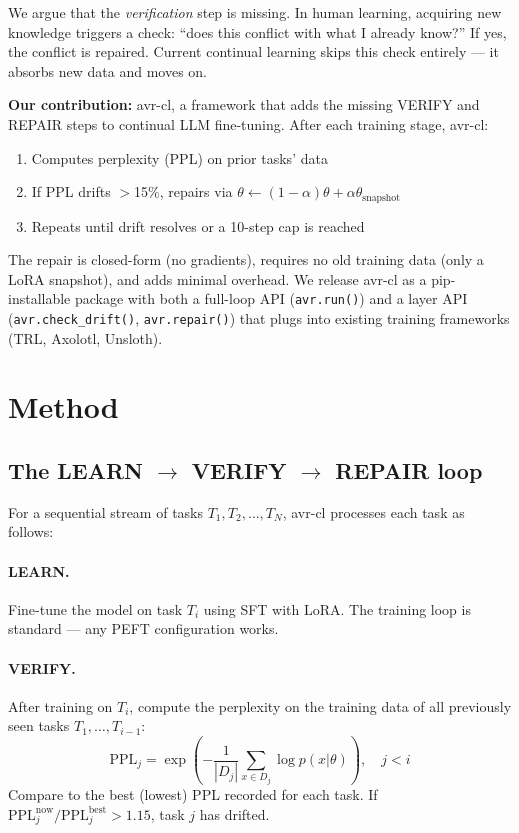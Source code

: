 \documentclass{article}
\begin{document}
We argue that the \emph{verification} step is missing. In human learning, acquiring new knowledge triggers a check: ``does this conflict with what I already know?'' If yes, the conflict is repaired. Current continual learning skips this check entirely — it absorbs new data and moves on.

\textbf{Our contribution:} avr-cl, a framework that adds the missing VERIFY and REPAIR steps to continual LLM fine-tuning. After each training stage, avr-cl:
\begin{enumerate}
    \item Computes perplexity (PPL) on prior tasks' data
    \item If PPL drifts $>$15\%, repairs via $\theta \leftarrow (1-\alpha)\theta + \alpha \theta_{\text{snapshot}}$
    \item Repeats until drift resolves or a 10-step cap is reached
\end{enumerate}

The repair is closed-form (no gradients), requires no old training data (only a LoRA snapshot), and adds minimal overhead. We release avr-cl as a pip-installable package with both a full-loop API (\texttt{avr.run()}) and a layer API (\texttt{avr.check\_drift()}, \texttt{avr.repair()}) that plugs into existing training frameworks (TRL, Axolotl, Unsloth).

\section{Method}

\subsection{The LEARN $\to$ VERIFY $\to$ REPAIR loop}

For a sequential stream of tasks $T_1, T_2, \ldots, T_N$, avr-cl processes each task as follows:

\paragraph{LEARN.} Fine-tune the model on task $T_i$ using SFT with LoRA. The training loop is standard — any PEFT configuration works.

\paragraph{VERIFY.} After training on $T_i$, compute the perplexity on the training data of all previously seen tasks $T_1, \ldots, T_{i-1}$:
$$\text{PPL}_j = \exp\left(-\frac{1}{|D_j|} \sum_{x \in D_j} \log p(x|\theta)\right), \quad j < i$$
Compare to the best (lowest) PPL recorded for each task. If $\text{PPL}_j^{\text{now}} / \text{PPL}_j^{\text{best}} > 1.15$, task $j$ has drifted.
\end{document}
